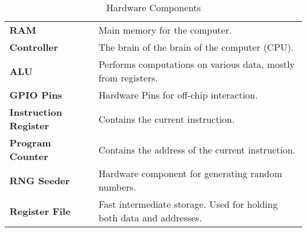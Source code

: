 \newcommand{\hw}[2]{%
	\textbf{#1} & #2 \\%
	\hline%
}
\begin{table}[H]
	\begin{tabularx}{\textwidth}{| a | x |}
		\hline
		 &  \\
		\hline
		\hw{RAM}{Main memory for the computer.}
		\hw{Controller}{The brain of the brain of the computer (CPU).}
		\hw{ALU}{Performs computations on various data, mostly from registers.}
		\hw{GPIO Pins}{Hardware Pins for off-chip interaction.}
		\hw{Instruction Register}{Contains the current instruction.}
		\hw{Program Counter}{Contains the address of the current instruction.}
		\hw{RNG Seeder}{Hardware component for generating random numbers.}
		\hw{Register File}{Fast intermediate storage. Used for holding both data and addresses.}
	\end{tabularx}
	\caption{Hardware Components}
\end{table}

